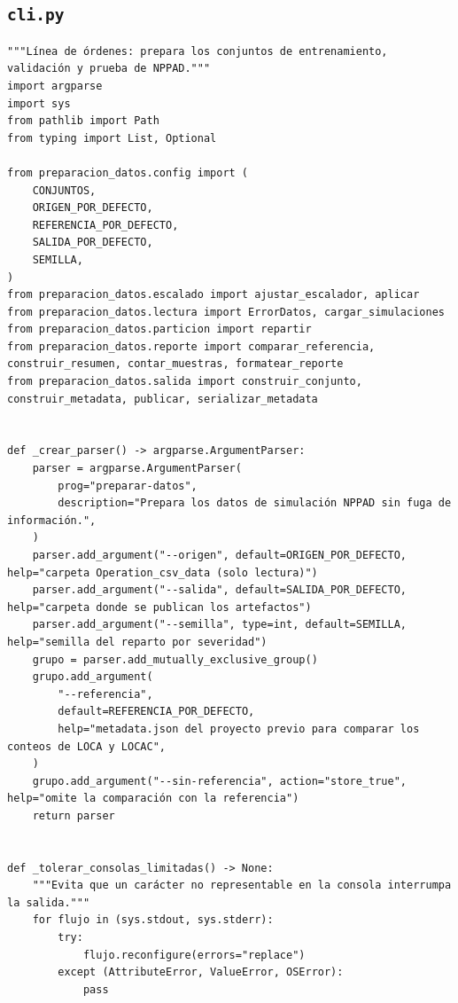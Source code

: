 \documentclass[12pt,a4paper]{article}
\begin{document}
\subsection*{\texttt{cli.py}}
\begin{lstlisting}
"""Línea de órdenes: prepara los conjuntos de entrenamiento, validación y prueba de NPPAD."""
import argparse
import sys
from pathlib import Path
from typing import List, Optional

from preparacion_datos.config import (
    CONJUNTOS,
    ORIGEN_POR_DEFECTO,
    REFERENCIA_POR_DEFECTO,
    SALIDA_POR_DEFECTO,
    SEMILLA,
)
from preparacion_datos.escalado import ajustar_escalador, aplicar
from preparacion_datos.lectura import ErrorDatos, cargar_simulaciones
from preparacion_datos.particion import repartir
from preparacion_datos.reporte import comparar_referencia, construir_resumen, contar_muestras, formatear_reporte
from preparacion_datos.salida import construir_conjunto, construir_metadata, publicar, serializar_metadata


def _crear_parser() -> argparse.ArgumentParser:
    parser = argparse.ArgumentParser(
        prog="preparar-datos",
        description="Prepara los datos de simulación NPPAD sin fuga de información.",
    )
    parser.add_argument("--origen", default=ORIGEN_POR_DEFECTO, help="carpeta Operation_csv_data (solo lectura)")
    parser.add_argument("--salida", default=SALIDA_POR_DEFECTO, help="carpeta donde se publican los artefactos")
    parser.add_argument("--semilla", type=int, default=SEMILLA, help="semilla del reparto por severidad")
    grupo = parser.add_mutually_exclusive_group()
    grupo.add_argument(
        "--referencia",
        default=REFERENCIA_POR_DEFECTO,
        help="metadata.json del proyecto previo para comparar los conteos de LOCA y LOCAC",
    )
    grupo.add_argument("--sin-referencia", action="store_true", help="omite la comparación con la referencia")
    return parser


def _tolerar_consolas_limitadas() -> None:
    """Evita que un carácter no representable en la consola interrumpa la salida."""
    for flujo in (sys.stdout, sys.stderr):
        try:
            flujo.reconfigure(errors="replace")
        except (AttributeError, ValueError, OSError):
            pass



\end{lstlisting}
\end{document}

